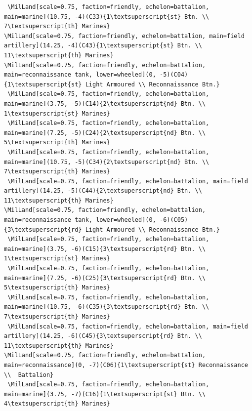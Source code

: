 \documentclass[a4paper, titlepage]{article}
\newenvironment{writett}{\ttfamily}{\par}
\begin{document}
\begin{landscape}
\begin{writett}
\begin{verbatim}
 \MilLand[scale=0.75, faction=friendly, echelon=battalion, main=marine](10.75, -4)(C33){1\textsuperscript{st} Btn. \\ 7\textsuperscript{th} Marines}
\MilLand[scale=0.75, faction=friendly, echelon=battalion, main=field artillery](14.25, -4)(C43){1\textsuperscript{st} Btn. \\ 11\textsuperscript{th} Marines}
\MilLand[scale=0.75, faction=friendly, echelon=battalion, main=reconnaissance tank, lower=wheeled](0, -5)(C04){1\textsuperscript{st} Light Armoured \\ Reconnaissance Btn.}
 \MilLand[scale=0.75, faction=friendly, echelon=battalion, main=marine](3.75, -5)(C14){2\textsuperscript{nd} Btn. \\ 1\textsuperscript{st} Marines}
 \MilLand[scale=0.75, faction=friendly, echelon=battalion, main=marine](7.25, -5)(C24){2\textsuperscript{nd} Btn. \\ 5\textsuperscript{th} Marines}
 \MilLand[scale=0.75, faction=friendly, echelon=battalion, main=marine](10.75, -5)(C34){2\textsuperscript{nd} Btn. \\ 7\textsuperscript{th} Marines}
 \MilLand[scale=0.75, faction=friendly, echelon=battalion, main=field artillery](14.25, -5)(C44){2\textsuperscript{nd} Btn. \\ 11\textsuperscript{th} Marines}
\MilLand[scale=0.75, faction=friendly, echelon=battalion, main=reconnaissance tank, lower=wheeled](0, -6)(C05){3\textsuperscript{rd} Light Armoured \\ Reconnaissance Btn.}
 \MilLand[scale=0.75, faction=friendly, echelon=battalion, main=marine](3.75, -6)(C15){3\textsuperscript{rd} Btn. \\ 1\textsuperscript{st} Marines}
 \MilLand[scale=0.75, faction=friendly, echelon=battalion, main=marine](7.25, -6)(C25){3\textsuperscript{rd} Btn. \\ 5\textsuperscript{th} Marines}
 \MilLand[scale=0.75, faction=friendly, echelon=battalion, main=marine](10.75, -6)(C35){3\textsuperscript{rd} Btn. \\ 7\textsuperscript{th} Marines}
 \MilLand[scale=0.75, faction=friendly, echelon=battalion, main=field artillery](14.25, -6)(C45){3\textsuperscript{rd} Btn. \\ 11\textsuperscript{th} Marines}
\MilLand[scale=0.75, faction=friendly, echelon=battalion, main=reconnaissance](0, -7)(C06){1\textsuperscript{st} Reconnaissance \\  Battalion}
 \MilLand[scale=0.75, faction=friendly, echelon=battalion, main=marine](3.75, -7)(C16){1\textsuperscript{st} Btn. \\ 4\textsuperscript{th} Marines}

\end{verbatim}
\end{writett}
\end{landscape}
\end{document}
